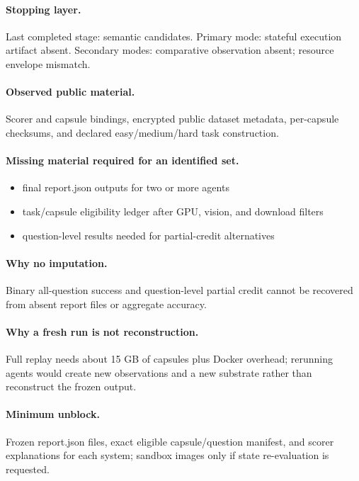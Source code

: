 \paragraph{Stopping layer.} Last completed stage: semantic candidates. Primary mode: stateful execution artifact absent. Secondary modes: comparative observation absent; resource envelope mismatch.

\paragraph{Observed public material.} Scorer and capsule bindings, encrypted public dataset metadata, per-capsule checksums, and declared easy/medium/hard task construction.

\paragraph{Missing material required for an identified set.}
\begin{itemize}
  \item final report.json outputs for two or more agents
  \item task/capsule eligibility ledger after GPU, vision, and download filters
  \item question-level results needed for partial-credit alternatives
\end{itemize}

\paragraph{Why no imputation.} Binary all-question success and question-level partial credit cannot be recovered from absent report files or aggregate accuracy.

\paragraph{Why a fresh run is not reconstruction.} Full replay needs about 15 GB of capsules plus Docker overhead; rerunning agents would create new observations and a new substrate rather than reconstruct the frozen output.

\paragraph{Minimum unblock.} Frozen report.json files, exact eligible capsule/question manifest, and scorer explanations for each system; sandbox images only if state re-evaluation is requested.

